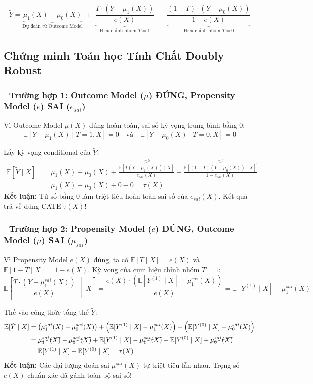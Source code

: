 \documentclass[11pt,a4paper]{article}
\newcommand{\Exp}{\mathbb{E}}
\begin{document}
\begin{equation}
\tilde{Y} = \underbrace{\mu_1(X) - \mu_0(X)}_{\text{Dự đoán từ Outcome Model}} \;+\; \underbrace{\frac{T \cdot (Y - \mu_1(X))}{e(X)}}_{\text{Hiệu chỉnh nhóm } T=1} \;-\; \underbrace{\frac{(1-T) \cdot (Y - \mu_0(X))}{1 - e(X)}}_{\text{Hiệu chỉnh nhóm } T=0}
\end{equation}

\subsection{Chứng minh Toán học Tính Chất Doubly Robust}

\subsubsection{🔴 Trường hợp 1: Outcome Model ($\mu$) ĐÚNG, Propensity Model ($e$) SAI ($e_{sai}$)}
Vì Outcome Model $\mu(X)$ đúng hoàn toàn, sai số kỳ vọng trung bình bằng 0:
$$\Exp[Y - \mu_1(X) \mid T=1, X] = 0 \quad \text{và} \quad \Exp[Y - \mu_0(X) \mid T=0, X] = 0$$

Lấy kỳ vọng conditional của $\tilde{Y}$:
\begin{align*}
\Exp[\tilde{Y} \mid X] &= \mu_1(X) - \mu_0(X) + \frac{\overbrace{\Exp[T(Y - \mu_1(X)) \mid X]}^{= 0}}{e_{sai}(X)} - \frac{\overbrace{\Exp[(1-T)(Y - \mu_0(X)) \mid X]}^{= 0}}{1 - e_{sai}(X)} \\
&= \mu_1(X) - \mu_0(X) + 0 - 0 = \tau(X)
\end{align*}
\textbf{Kết luận:} Tử số bằng $0$ làm triệt tiêu hoàn toàn sai số của $e_{sai}(X)$. Kết quả trả về đúng CATE $\tau(X)$!

\subsubsection{🔵 Trường hợp 2: Propensity Model ($e$) ĐÚNG, Outcome Model ($\mu$) SAI ($\mu_{sai}$)}
Vì Propensity Model $e(X)$ đúng, ta có $\Exp[T \mid X] = e(X)$ và $\Exp[1-T \mid X] = 1 - e(X)$.
Kỳ vọng của cụm hiệu chỉnh nhóm $T=1$:
$$\Exp\left[ \frac{T \cdot (Y - \mu_1^{sai}(X))}{e(X)} \;\middle|\; X \right] = \frac{e(X) \cdot \left( \Exp[Y^{(1)} \mid X] - \mu_1^{sai}(X) \right)}{e(X)} = \Exp[Y^{(1)} \mid X] - \mu_1^{sai}(X)$$

Thế vào công thức tổng thể $\tilde{Y}$:
\begin{align*}
\Exp[\tilde{Y} \mid X] &= \left( \mu_1^{sai}(X) - \mu_0^{sai}(X) \right) + \left( \Exp[Y^{(1)} \mid X] - \mu_1^{sai}(X) \right) - \left( \Exp[Y^{(0)} \mid X] - \mu_0^{sai}(X) \right) \\
&= \cancel{\mu_1^{sai}(X)} - \cancel{\mu_0^{sai}(X)} + \Exp[Y^{(1)} \mid X] - \cancel{\mu_1^{sai}(X)} - \Exp[Y^{(0)} \mid X] + \cancel{\mu_0^{sai}(X)} \\
&= \Exp[Y^{(1)} \mid X] - \Exp[Y^{(0)} \mid X] = \tau(X)
\end{align*}
\textbf{Kết luận:} Các đại lượng đoán sai $\mu^{sai}(X)$ tự triệt tiêu lẫn nhau. Trọng số $e(X)$ chuẩn xác đã gánh toàn bộ sai số!
\end{document}
